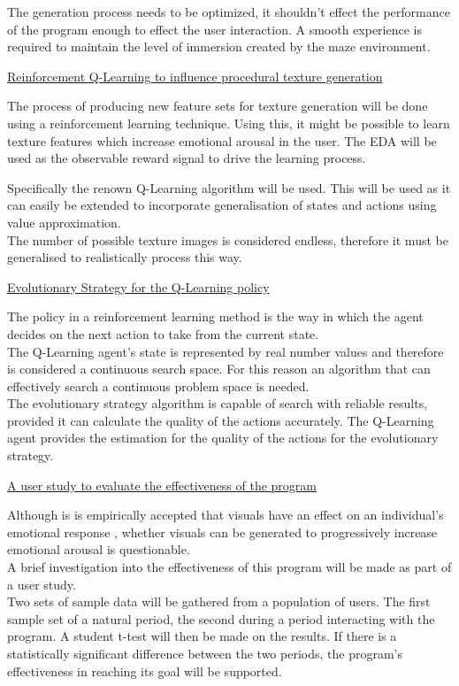 \documentclass{report}
\begin{document}
The generation process needs to be optimized, it shouldn't effect the performance of the program enough to effect the user interaction. A smooth experience is required
to maintain the level of immersion created by the maze environment.

\noindent\underline{Reinforcement Q-Learning to influence procedural texture generation}

The process of producing new feature sets for texture generation will be done using a reinforcement learning technique. Using this, it might be possible to learn texture
features which increase emotional arousal in the user. The EDA will be used as the observable reward signal to drive the learning process.

Specifically the renown Q-Learning algorithm will be used. This will be used as it can easily be extended to incorporate generalisation of states and actions using value approximation.\\
The number of possible texture images is considered endless, therefore it must be generalised to realistically process this way.

\noindent\underline{Evolutionary Strategy for the Q-Learning policy}

The policy in a reinforcement learning method is the way in which the agent decides on the next action to take from the current state.\\
The Q-Learning agent's state is represented by real number values and therefore is considered a continuous search space. For this reason an algorithm that can effectively
search a continuous problem space is needed.\\
The evolutionary strategy algorithm is capable of search with reliable results, provided it can calculate the quality of the actions accurately. The Q-Learning agent provides
the estimation for the quality of the actions for the evolutionary strategy.

\noindent\underline{A user study to evaluate the effectiveness of the program}

Although is is empirically accepted that visuals have an effect on an individual's emotional response \citep{pitchforth2010emotional}, whether visuals can be generated
to progressively increase emotional arousal is questionable.\\
A brief investigation into the effectiveness of this program will be made as part of a user study.\\
Two sets of sample data will be gathered from a population of users. The first sample set of a natural period, the second during a period interacting with the program. 
A student t-test will then be made on the results. If there is a statistically significant difference between the two periods, the program's effectiveness in 
reaching its goal will be supported.
\end{document}
